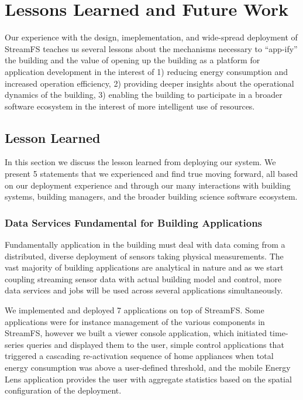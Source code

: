 
\chapter{Lessons Learned and Future Work}
\label{chap:future}

Our experience with the design, imeplementation, and wide-spread deployment of StreamFS teaches us several lessons about
the mechanisms necessary to ``app-ify'' the building and the value of opening up the building as a platform for application 
development in the interest of 1) reducing energy consumption and increased operation efficiency, 2) providing deeper
insights about the operational dynamics of the building, 3) enabling the building to participate in a broader
software ecosystem in the interest of more intelligent use of resources. 

\section{Lesson Learned}
In this section we discuss the lesson learned from deploying our system.  We present 5 statements that we experienced 
and find true moving forward, all based on our deployment experience and through our many interactions with building
systems, building managers, and the broader building science software ecosystem. 

\subsection{Data Services Fundamental for Building Applications}
Fundamentally application in the building must deal with data coming from a distributed, diverse deployment of sensors
taking physical measurements.  The vast majority of building applications are analytical in nature and as we start coupling
streaming sensor data with actual building model and control, more data services and jobs will be used across 
several applications simultaneously.

We implemented and deployed 7 applications on top of StreamFS.  Some applications were for instance management of the various 
components in
StreamFS, however we built a viewer console application, which initiated time-series queries and displayed them to the user,
simple control applications that triggered a cascading re-activation sequence of home appliances when total energy consumption
was above a user-defined threshold, and the mobile Energy Lens application provides the user with aggregate statistics based on
the spatial configuration of the deployment.


